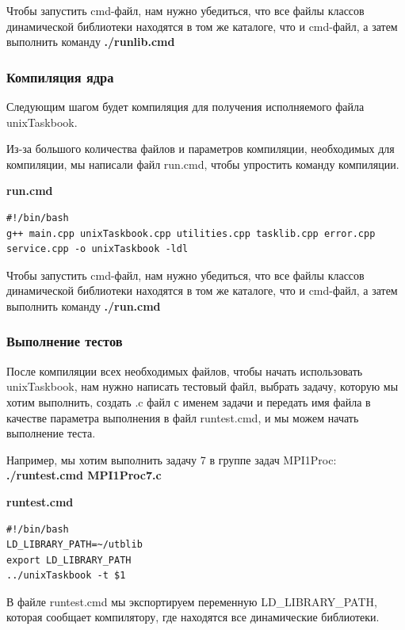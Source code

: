 Чтобы запустить cmd-файл, нам нужно убедиться, что все файлы классов динамической 
библиотеки находятся в том же каталоге, что и cmd-файл, а затем выполнить команду \textbf{./runlib.cmd}

\subsubsection{Компиляция ядра}

Следующим шагом будет компиляция для получения исполняемого файла unixTaskbook.

Из-за большого количества файлов и параметров компиляции, необходимых для 
компиляции, мы написали файл run.cmd, чтобы упростить команду компиляции.

\centerline{\textbf{run.cmd}}

\lstset{language=bash}
\begin{lstlisting}
#!/bin/bash
g++ main.cpp unixTaskbook.cpp utilities.cpp tasklib.cpp error.cpp service.cpp -o unixTaskbook -ldl
\end{lstlisting}

Чтобы запустить cmd-файл, нам нужно убедиться, что все файлы классов динамической 
библиотеки находятся в том же каталоге, что и cmd-файл, а затем выполнить команду \textbf{./run.cmd}

\subsubsection{Выполнение тестов}

После компиляции всех необходимых файлов, чтобы начать использовать unixTaskbook, нам 
нужно написать тестовый файл, выбрать задачу, которую мы хотим выполнить, создать .c файл 
с именем задачи и передать имя файла в качестве параметра выполнения в файл runtest.cmd, и 
мы можем начать выполнение теста.

Например, мы хотим выполнить задачу 7 в группе задач MPI1Proc: 
\\ \textbf{./runtest.cmd MPI1Proc7.c}

\centerline{\textbf{runtest.cmd}}

\lstset{language=bash}
\begin{lstlisting}
#!/bin/bash
LD_LIBRARY_PATH=~/utblib
export LD_LIBRARY_PATH
../unixTaskbook -t $1
\end{lstlisting}

В файле runtest.cmd мы экспортируем переменную LD\_LIBRARY\_PATH, 
которая сообщает компилятору, где находятся все динамические библиотеки.

